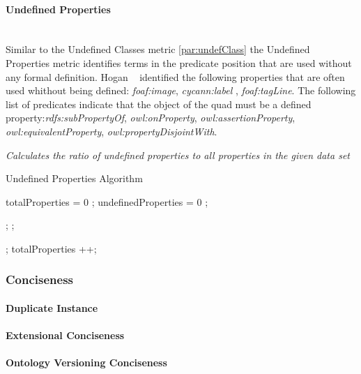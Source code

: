 \paragraph{Undefined  Properties}  ~\\ 


Similar to the Undefined Classes metric \ref{par:undefClass} the Undefined Properties metric identifies terms in the predicate position that are used without any formal definition.
 Hogan  ~\cite{hogan2010} identified the following properties that are often used whithout being defined:  \textit{foaf:image}, \textit{cycann:label} , \textit{foaf:tagLine}.
The following list of predicates indicate that the object of the quad must be a defined property:\textit{rdfs:subPropertyOf}, \textit{owl:onProperty}, \textit{owl:assertionProperty}, \textit{owl:equivalentProperty}, \textit{owl:propertyDisjointWith}.

\begin{mdframed}[style=metricdefinition]
\emph{Calculates the ratio of undefined properties to all properties in the given data set}
\end{mdframed}

\begin{algorithm}
\caption{Undefined Properties Algorithm}\label{lst:undefCl}
\begin{algorithmic}[1]
\State totalProperties = 0 ;
\State undefinedProperties = 0 ;
\EndProcedure

 ; 
; \EndIf

; \EndIf
\State totalProperties ++;
\EndIf

\EndProcedure
\end{algorithmic}
\end{algorithm}


\subsubsection{Conciseness}

\paragraph{Duplicate Instance}

\paragraph{Extensional Conciseness}

\paragraph{Ontology Versioning Conciseness}



